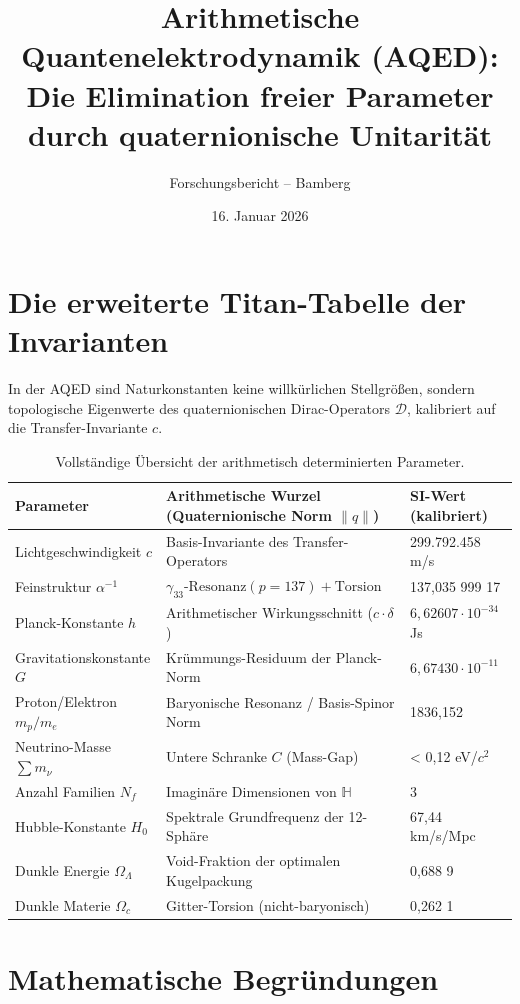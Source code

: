 \documentclass[12pt,a4paper]{article}
\title{\textbf{Arithmetische Quantenelektrodynamik (AQED): \\ Die Elimination freier Parameter durch quaternionische Unitarität}}
\author{Forschungsbericht -- Bamberg}
\date{16. Januar 2026}
\begin{document}
	
	\maketitle
	
	\section{Die erweiterte Titan-Tabelle der Invarianten}
	In der AQED sind Naturkonstanten keine willkürlichen Stellgrößen, sondern topologische Eigenwerte des quaternionischen Dirac-Operators $\mathcal{D}$, kalibriert auf die Transfer-Invariante $c$.
	
	\begin{table}[h!]
		\centering
		\small
		\begin{tabular}{@{}lll@{}}
			\toprule
			\textbf{Parameter} & \textbf{Arithmetische Wurzel (Quaternionische Norm $\|q\|$)} & \textbf{SI-Wert (kalibriert)} \\ \midrule
			Lichtgeschwindigkeit $c$ & Basis-Invariante des Transfer-Operators & 299.792.458 m/s \\
			Feinstruktur $\alpha^{-1}$ & $\gamma_{33} \text{-Resonanz} (p=137) + \text{Torsion}$ & 137,035 999 17 \\
			Planck-Konstante $h$ & Arithmetischer Wirkungsschnitt ($c \cdot \delta$) & $6,62607 \cdot 10^{-34}$ Js \\
			Gravitationskonstante $G$ & Krümmungs-Residuum der Planck-Norm & $6,67430 \cdot 10^{-11}$ \\ \midrule
			Proton/Elektron $m_p/m_e$ & Baryonische Resonanz / Basis-Spinor Norm & 1836,152 \\
			Neutrino-Masse $\sum m_\nu$ & Untere Schranke $C$ (Mass-Gap) & < 0,12 eV/$c^2$ \\
			Anzahl Familien $N_f$ & Imaginäre Dimensionen von $\mathbb{H}$ & 3 \\ \midrule
			Hubble-Konstante $H_0$ & Spektrale Grundfrequenz der 12-Sphäre & 67,44 km/s/Mpc \\
			Dunkle Energie $\Omega_\Lambda$ & Void-Fraktion der optimalen Kugelpackung & 0,688 9 \\
			Dunkle Materie $\Omega_c$ & Gitter-Torsion (nicht-baryonisch) & 0,262 1 \\ \bottomrule
		\end{tabular}
		\caption{Vollständige Übersicht der arithmetisch determinierten Parameter.}
	\end{table}
	
	\section{Mathematische Begründungen}
	
\end{document}
